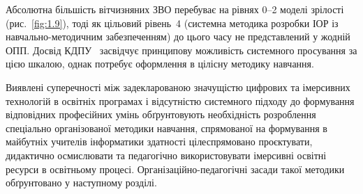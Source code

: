 Абсолютна більшість вітчизняних ЗВО перебуває на рівнях 0--2 моделі зрілості (рис.~\ref{fig:1.9}), тоді як цільовий рівень~4 (системна методика розробки ІОР із навчально-методичним забезпеченням) до цього часу не представлений у жодній ОПП. Досвід КДПУ~\cite{Shepiliev2020WebAR, Shepiliev2021Career, Semerikov2022IERDesign, Semerikov2024WebARML_CoSinE} засвідчує принципову можливість системного просування за цією шкалою, однак потребує оформлення в цілісну методику навчання.


Виявлені суперечності між задекларованою значущістю цифрових та імерсивних технологій в освітніх програмах і відсутністю системного підходу до формування відповідних професійних умінь обґрунтовують необхідність розроблення спеціально організованої методики навчання, спрямованої на формування в майбутніх учителів інформатики здатності цілеспрямовано проєктувати, дидактично осмислювати та педагогічно використовувати імерсивні освітні ресурси в освітньому процесі. Організаційно-педагогічні засади такої методики обґрунтовано у наступному розділі.

